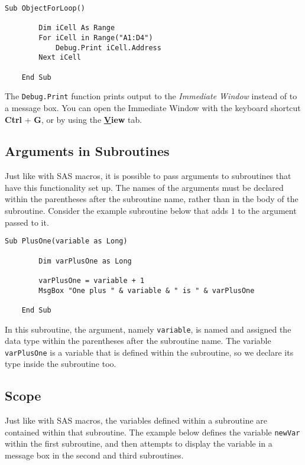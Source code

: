 \documentclass[11pt]{article}%
\begin{document}
\begin{lstlisting}[style=A]
    Sub ObjectForLoop()

        Dim iCell As Range
        For iCell in Range("A1:D4")
            Debug.Print iCell.Address
        Next iCell

    End Sub
\end{lstlisting}

The \texttt{Debug.Print} function prints output to the \textit{Immediate Window} instead of to a message box. You can open the Immediate Window with the keyboard shortcut \textbf{Ctrl} + \textbf{G}, or by using the \textbf{\underline{V}iew} tab.



\subsection{Arguments in Subroutines}

Just like with SAS macros, it is possible to pass arguments to subroutines that have this functionality set up. The names of the arguments must be declared within the parentheses after the subroutine name, rather than in the body of the subroutine. Consider the example subroutine below that adds \(1\) to the argument passed to it.\\

\begin{lstlisting}[style=A]
    Sub PlusOne(variable as Long)

        Dim varPlusOne as Long

        varPlusOne = variable + 1
        MsgBox "One plus " & variable & " is " & varPlusOne

    End Sub
\end{lstlisting}

In this subroutine, the argument, namely \texttt{variable}, is named and assigned the  data type within the parentheses after the subroutine name. The variable \texttt{varPlusOne} is a variable that is defined within the subroutine, so we declare its type inside the subroutine too.


\subsection{Scope}

Just like with SAS macros, the variables defined within a subroutine are contained within that subroutine. The example below defines the variable \texttt{newVar} within the first subroutine, and then attempts to display the variable in a message box in the second and third subroutines. \\
\end{document}
